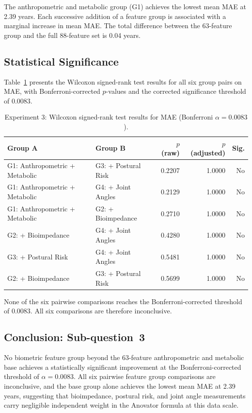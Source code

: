 \documentclass[11pt,a4paper]{report}
\begin{document}
The anthropometric and metabolic group (G1) achieves the lowest mean MAE at 2.39 years. Each
successive addition of a feature group is associated with a marginal increase in mean MAE. The
total difference between the 63-feature group and the full 88-feature set is 0.04 years.

\subsection{Statistical Significance}

Table~\ref{tab:exp3_sig} presents the Wilcoxon signed-rank test results for all six group pairs
on MAE, with Bonferroni-corrected $p$-values and the corrected significance threshold of 0.0083.

\begin{table}[h]
  \centering
  \caption{Experiment 3: Wilcoxon signed-rank test results for MAE (Bonferroni $\alpha = 0.0083$).}
  \label{tab:exp3_sig}
  \begin{tabular}{llrrr}
    \toprule
    \textbf{Group A} & \textbf{Group B} & \textbf{$p$ (raw)} & \textbf{$p$ (adjusted)} & \textbf{Sig.} \\
    \midrule
    G1: Anthropometric + Metabolic & G3: + Postural Risk   & 0.2207 & 1.0000 & No \\
    G1: Anthropometric + Metabolic & G4: + Joint Angles    & 0.2129 & 1.0000 & No \\
    G1: Anthropometric + Metabolic & G2: + Bioimpedance    & 0.2710 & 1.0000 & No \\
    G2: + Bioimpedance             & G4: + Joint Angles    & 0.4280 & 1.0000 & No \\
    G3: + Postural Risk            & G4: + Joint Angles    & 0.5481 & 1.0000 & No \\
    G2: + Bioimpedance             & G3: + Postural Risk   & 0.5699 & 1.0000 & No \\
    \bottomrule
  \end{tabular}
\end{table}

None of the six pairwise comparisons reaches the Bonferroni-corrected threshold of 0.0083. All six
comparisons are therefore inconclusive.

\subsection{Conclusion: Sub-question~3}

No biometric feature group beyond the 63-feature anthropometric and metabolic base achieves a
statistically significant improvement at the Bonferroni-corrected threshold of $\alpha = 0.0083$.
All six pairwise feature group comparisons are inconclusive, and the base group alone achieves the
lowest mean MAE at 2.39 years, suggesting that bioimpedance, postural risk, and joint angle
measurements carry negligible independent weight in the Anovator formula at this data scale.
\end{document}
